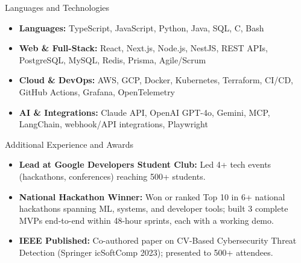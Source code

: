 \documentclass[]{mcdowellcv}
\begin{document}
\begin{cvsection}{Languages and Technologies}
  \begin{cvsubsection}{}{}{}
    \begin{itemize}
      \item \textbf{Languages:} TypeScript, JavaScript, Python, Java, SQL, C, Bash
      \item \textbf{Web \& Full-Stack:} React, Next.js, Node.js, NestJS, REST APIs, PostgreSQL, MySQL, Redis, Prisma, Agile/Scrum
      \item \textbf{Cloud \& DevOps:} AWS, GCP, Docker, Kubernetes, Terraform, CI/CD, GitHub Actions, Grafana, OpenTelemetry
      \item \textbf{AI \& Integrations:} Claude API, OpenAI GPT-4o, Gemini, MCP, LangChain, webhook/API integrations, Playwright
    \end{itemize}
  \end{cvsubsection}
\end{cvsection}

\begin{cvsection}{Additional Experience and Awards}
  \begin{cvsubsection}{}{}{}
    \begin{itemize}
      \item \textbf{Lead at Google Developers Student Club:} Led 4+ tech events (hackathons, conferences) reaching 500+ students.
      \item \textbf{National Hackathon Winner:} Won or ranked Top 10 in 6+ national hackathons spanning ML, systems, and developer tools; built 3 complete MVPs end-to-end within 48-hour sprints, each with a working demo.
      \item \textbf{IEEE Published:} Co-authored paper on CV-Based Cybersecurity Threat Detection (Springer icSoftComp 2023); presented to 500+ attendees.
    \end{itemize}
  \end{cvsubsection}
\end{cvsection}
\end{document}
